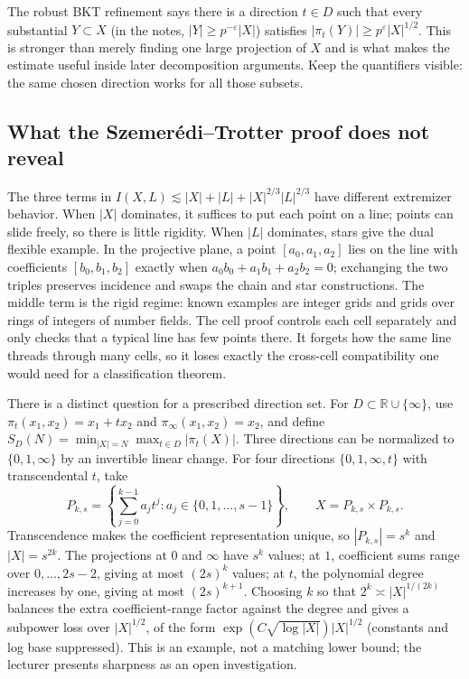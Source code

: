 The robust BKT refinement says there is a direction \(t\in D\) such that every substantial \(Y\subset X\) (in the notes, \(|Y|\ge p^{-\varepsilon}|X|\)) satisfies \(|\pi_t(Y)|\ge p^{\varepsilon}|X|^{1/2}\). This is stronger than merely finding one large projection of \(X\) and is what makes the estimate useful inside later decomposition arguments. Keep the quantifiers visible: the same chosen direction works for all those subsets.

\subsection{What the Szemerédi--Trotter proof does not reveal}\label{04-visual-computing-ii-ch033-what-the-szemeruxe9ditrotter-proof-does-not-reveal}

\hypertarget{04-visual-computing-ii-ch033-what-the-szemeréditrotter-proof-does-not-reveal}{}

The three terms in \(I(X,L)\lesssim |X|+|L|+|X|^{2/3}|L|^{2/3}\) have different extremizer behavior. When \(|X|\) dominates, it suffices to put each point on a line; points can slide freely, so there is little rigidity. When \(|L|\) dominates, stars give the dual flexible example. In the projective plane, a point \([a_0,a_1,a_2]\) lies on the line with coefficients \([b_0,b_1,b_2]\) exactly when \(a_0b_0+a_1b_1+a_2b_2=0\); exchanging the two triples preserves incidence and swaps the chain and star constructions. The middle term is the rigid regime: known examples are integer grids and grids over rings of integers of number fields. The cell proof controls each cell separately and only checks that a typical line has few points there. It forgets how the same line threads through many cells, so it loses exactly the cross-cell compatibility one would need for a classification theorem.

There is a distinct question for a prescribed direction set. For \(D\subset\mathbb R\cup\{\infty\}\), use \(\pi_t(x_1,x_2)=x_1+tx_2\) and \(\pi_\infty(x_1,x_2)=x_2\), and define \(S_D(N)=\min_{|X|=N}\max_{t\in D}|\pi_t(X)|\). Three directions can be normalized to \(\{0,1,\infty\}\) by an invertible linear change. For four directions \(\{0,1,\infty,t\}\) with transcendental \(t\), take \[
P_{k,s}=\left\{\sum_{j=0}^{k-1}a_jt^j: a_j\in\{0,1,\ldots,s-1\}\right\},\qquad X=P_{k,s}\times P_{k,s}.
\] Transcendence makes the coefficient representation unique, so \(|P_{k,s}|=s^k\) and \(|X|=s^{2k}\). The projections at \(0\) and \(\infty\) have \(s^k\) values; at \(1\), coefficient sums range over \(0,\ldots,2s-2\), giving at most \((2s)^k\) values; at \(t\), the polynomial degree increases by one, giving at most \((2s)^{k+1}\). Choosing \(k\) so that \(2^k\asymp |X|^{1/(2k)}\) balances the extra coefficient-range factor against the degree and gives a subpower loss over \(|X|^{1/2}\), of the form \(\exp(C\sqrt{\log |X|})|X|^{1/2}\) (constants and log base suppressed). This is an example, not a matching lower bound; the lecturer presents sharpness as an open investigation.

